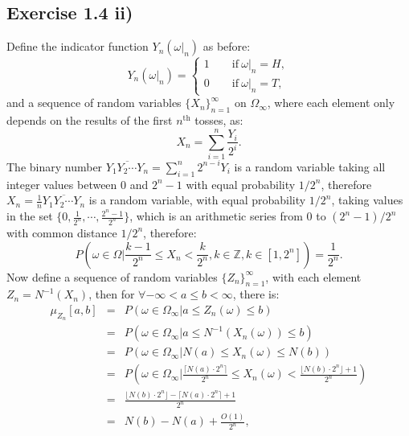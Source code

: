 \documentclass[final,3p,authoryear]{elsarticle}
\begin{document}
	\subsection{Exercise 1.4 ii)}
		Define the indicator function $Y_n(\omega|_n)$ as before:
		\begin{equation}
			Y_n(\omega|_n)=
			\begin{cases}
				1\qquad \mathrm{if~} \omega|_n=H,\\
				0\qquad \mathrm{if~} \omega|_n=T,
			\end{cases}
		\end{equation}
		and a sequence of random variables $\{X_n\}_{n=1}^{\infty}$ on $\Omega_\infty$, where each element only depends on the results of the first $n^\mathrm{th}$ tosses, as:
		\begin{equation}
			X_n=\sum\limits_{i=1}^{n} \frac{Y_i}{2^i}
			.
		\end{equation}
		The binary number $\overline{Y_1 Y_2 \cdots Y_n}=\sum\limits_{i=1}^{n} 2^{n-i} Y_i$ is a random variable taking all integer values between $0$ and $2^n-1$ with equal probability $1/2^n$, therefore $X_n=\frac{1}{n} \overline{Y_1 Y_2 \cdots Y_n}$ is a random variable, with equal probability $1/2^n$, taking values in the set $\{0, \frac{1}{2^n}, \cdots, \frac{2^n-1}{2^n}\}$, which is an arithmetic series from $0$ to $(2^n-1)/2^n$ with common distance $1/2^n$, therefore:
		\begin{equation}
			P(\omega \in \Omega| \frac{k-1}{2^n} \leq X_n < \frac{k}{2^n}, k \in \mathbb{Z},k \in [1,2^n]) = \frac{1}{2^n}
			.
		\end{equation}
		Now define a sequence of random variables $\{Z_n\}_{n=1}^{\infty}$, with each element $Z_n = N^{-1}(X_n)$, then for $\forall -\infty < a \leq b < \infty$, there is:
		\begin{eqnarray}
			\mu_{Z_n}[a,b]&=&P(\omega \in \Omega_\infty| a \leq Z_n(\omega) \leq b)
			\nonumber\\
			&=&P(\omega \in \Omega_\infty| a \leq N^{-1}(X_n(\omega)) \leq b)
			\nonumber\\
			&=&P(\omega \in \Omega_\infty| N(a) \leq X_n(\omega) \leq N(b))
			\nonumber\\
			&=&P(\omega \in \Omega_\infty| \frac{\lceil N(a)\cdot 2^n \rceil}{2^n} \leq X_n(\omega) < \frac{\lfloor N(b)\cdot 2^n \rfloor + 1}{2^n})
			\nonumber\\
			&=& \frac{\lfloor N(b)\cdot 2^n \rfloor - \lceil N(a)\cdot 2^n \rceil + 1}{2^n}
			\nonumber\\
			&=&N(b)-N(a) + \frac{O(1)}{2^n}
			,
		\end{eqnarray}
\end{document}
